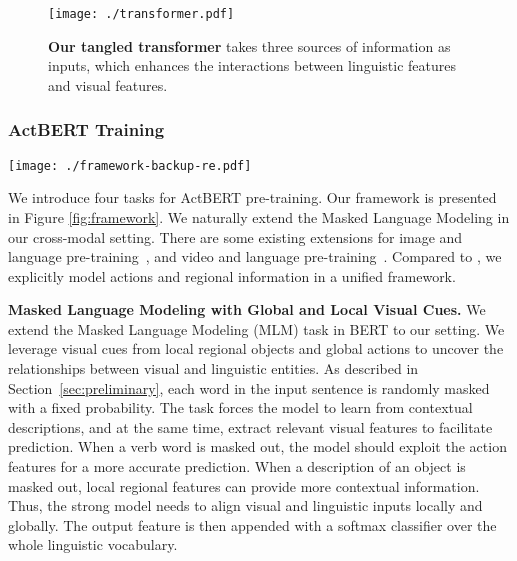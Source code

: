 \documentclass[10pt,twocolumn,letterpaper]{article}
\newcommand{\ours}{ActBERT\xspace}
\begin{document}
\begin{figure}[t]
\centering
\texttt{[image: ./transformer.pdf]}
    \caption{\textbf{Our tangled transformer} takes three sources of information as inputs, which enhances the interactions between linguistic features and visual features.}
    \label{fig:our_transformer}
\end{figure}

\subsubsection{\ours Training}

\begin{figure*}[t]
\centering
\texttt{[image: ./framework-backup-re.pdf]}
    \caption{\textbf{Our \ours framework}. We incorporate three sources of information during pre-training, \ie, global actions, local regional objects, and text descriptions.
    The yellow grid indicates that the action or the region object is masked out.
    }
    \label{fig:framework}
\end{figure*}

We introduce four tasks for \ours pre-training. Our framework is presented in Figure \ref{fig:framework}.
We naturally extend the Masked Language Modeling in our cross-modal setting. There are some existing extensions for image and language pre-training~\cite{lu2019vilbert,sun2019videobert}, and video and language pre-training~\cite{sun2019videobert}. Compared to \cite{sun2019videobert}, we explicitly model actions and regional information in a unified framework. 

\noindent\textbf{Masked Language Modeling with Global and Local Visual Cues.}
We extend the Masked Language Modeling (MLM) task in BERT to our setting. We leverage visual cues from local regional objects and global actions to uncover the relationships between visual and linguistic entities. As described in Section~\ref{sec:preliminary}, each word in the input sentence is randomly masked with a fixed probability.
The task forces the model to learn from contextual descriptions, and at the same time, extract relevant visual features to facilitate prediction.
When a verb word is masked out, the model should exploit the action features for a more accurate prediction. When a description of an object is masked out, local regional features can provide more contextual information. Thus, the strong model needs to align visual and linguistic inputs locally and globally.
The output feature is then appended with a softmax classifier over the whole linguistic vocabulary. 
\end{document}
